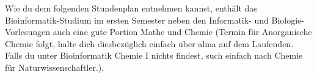 Wie du dem folgenden Stundenplan entnehmen kannst, enthält das Bioinformatik-Studium im ersten
Semester neben den Informatik- und Biologie-Vorlesungen auch eine gute Portion Mathe und Chemie (Termin für Anorganische Chemie folgt, halte dich diesbezüglich einfach über alma auf dem Laufenden. Falls du unter Bioinformatik Chemie I nichts findest, such einfach nach Chemie für Naturwissenschaftler.).\\
\noindent{}


